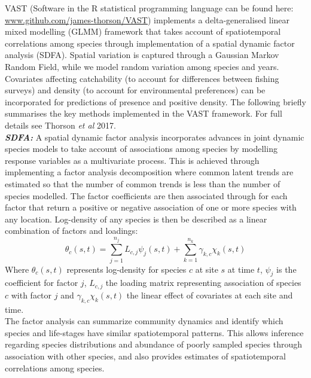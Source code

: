 \documentclass[fleqn,10pt]{wlscirep}
\begin{document}
\begin{linenumbers}
VAST (Software in the R statistical programming language can be found here:
\url{www.github.com/james-thorson/VAST}) implements a delta-generalised linear
mixed modelling (GLMM) framework that takes account of spatiotemporal
correlations among species through implementation of a spatial dynamic factor
analysis (SDFA). Spatial variation is captured through a Gaussian Markov Random
Field, while we model random variation among species and years. Covariates
affecting catchability (to account for differences between fishing surveys) and
density (to account for environmental preferences) can be incorporated for
predictions of presence and positive density. The following briefly summarises
the key methods implemented in the VAST framework. For full details see Thorson
\textit{et al} 2017\cite{Thorson2017}.\\

\textbf{\textit{SDFA:}} A spatial dynamic factor analysis incorporates advances
in joint dynamic species models\cite{Thorson2017} to take account of
associations among species by modelling response variables as a multivariate
process. This is achieved through implementing a factor analysis decomposition
where common latent trends are estimated so that the number of common trends is
less than the number of species modelled. The factor coefficients are then
associated through  for each factor
that return a positive or negative association of one or
more species with any location. Log-density of any species is then be described
as a linear combination of factors and loadings: \begin{equation}
	\theta_{c}(s,t) = \sum_{j=1}^{n_{j}} L_{c,j}\psi_{j}(s,t)
	+\sum_{k=1}^{n_{k}} \gamma_{k,c}\chi_{k}(s,t) \end{equation} Where
$\theta_{c}(s,t)$ represents log-density for species $c$ at site $s$ at time
$t$, $\psi_{j}$ is the coefficient for factor $j$, $L_{c,j}$ the loading matrix
representing association of species $c$ with
factor $j$ and $\gamma_{k,c}\chi_{k}(s,t)$ the linear effect of covariates at
each site and time\cite{Thorson2016b}. \\

The factor analysis can summarize community dynamics and identify which species
and life-stages have similar spatiotemporal patterns. This allows inference
regarding species distributions and abundance of poorly sampled species through
association with other species, and also provides estimates of spatiotemporal
correlations among species\cite{Thorson2016b}.\\


\end{linenumbers}
\end{document}

